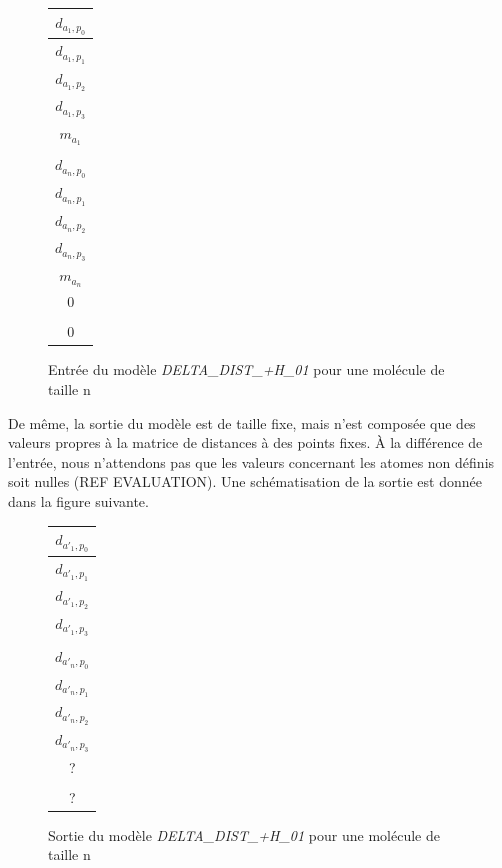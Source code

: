 \begin{figure}[!h]
	\centering
	
	\begin{tabular}{|c|}
		\hline
		$d_{a_1,p_0}$ \\ \hline
		$d_{a_1,p_1}$ \\ \hline
		$d_{a_1,p_2}$ \\ \hline
		$d_{a_1,p_3}$ \\ \hline
		$m_{a_1}$ \\ \hline
		\rot{... } \\ \hline
		$d_{a_n,p_0}$ \\ \hline
		$d_{a_n,p_1}$ \\ \hline
		$d_{a_n,p_2}$ \\ \hline
		$d_{a_n,p_3}$ \\ \hline
		$m_{a_n}$ \\ \hline
		0 \\ \hline
		\rot{... } \\ \hline
		0 \\ \hline		
	\end{tabular}

	\caption{Entrée du modèle \emph{DELTA\_DIST\_+H\_01} pour une molécule de taille n}
\end{figure}

\par De même, la sortie du modèle est de taille fixe, mais n'est composée que des valeurs propres à la matrice de distances à des points fixes. À la différence de l'entrée, nous n'attendons pas que les valeurs concernant les atomes non définis soit nulles (REF EVALUATION). Une schématisation de la sortie est donnée dans la figure suivante.

\begin{figure}[!h]
	\centering
	
	\begin{tabular}{|c|}
		\hline
		$d_{a'_1,p_0}$ \\ \hline
		$d_{a'_1,p_1}$ \\ \hline
		$d_{a'_1,p_2}$ \\ \hline
		$d_{a'_1,p_3}$ \\ \hline
		\rot{... } \\ \hline
		$d_{a'_n,p_0}$ \\ \hline
		$d_{a'_n,p_1}$ \\ \hline
		$d_{a'_n,p_2}$ \\ \hline
		$d_{a'_n,p_3}$ \\ \hline
		? \\ \hline
		\rot{... } \\ \hline
		? \\ \hline		
	\end{tabular}

	\caption{Sortie du modèle \emph{DELTA\_DIST\_+H\_01} pour une molécule de taille n}
\end{figure}

